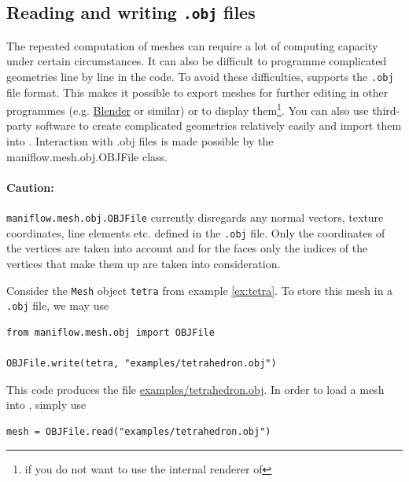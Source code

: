 \subsection{Reading and writing \texttt{.obj} files}\label{sec:objfiles}
The repeated computation of meshes can require a lot of computing capacity under certain circumstances. It can also be difficult to programme complicated geometries line by line in the code. To avoid these difficulties, \maniflow{} supports the \texttt{.obj} file format.
This makes it possible to export meshes for further editing in other programmes (e.g. \href{https://www.blender.org/}{Blender} or similar) or to display them\footnote{if you do not want to use the internal renderer of \maniflow{}}.
You can also use third-party software to create complicated geometries relatively easily and import them into \maniflow{}.
Interaction with .obj files is made possible by the maniflow.mesh.obj.OBJFile class.
\paragraph{Caution:} \texttt{maniflow.mesh.obj.OBJFile} currently disregards any normal vectors, texture coordinates, line elements etc. defined in the \texttt{.obj} file.
Only the coordinates of the vertices are taken into account and for the faces only the indices of the vertices that make them up are taken into consideration.
\begin{ex}
    Consider the \texttt{Mesh} object \texttt{tetra} from example \ref{ex:tetra}. To store this mesh in a \texttt{.obj} file, we may use
    \begin{lstlisting}
from maniflow.mesh.obj import OBJFile

OBJFile.write(tetra, "examples/tetrahedron.obj")
    \end{lstlisting}
    This code produces the file \url{examples/tetrahedron.obj}. In order to load a mesh into \maniflow{}, simply use
    \begin{lstlisting}
mesh = OBJFile.read("examples/tetrahedron.obj")
    \end{lstlisting}
\end{ex}
